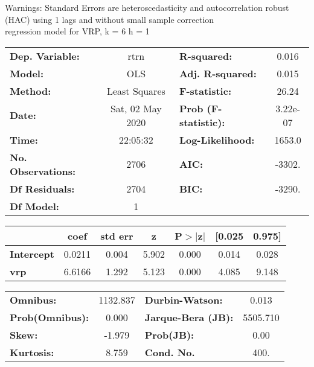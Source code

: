 Warnings: \newline
 [1] Standard Errors are heteroscedasticity and autocorrelation robust (HAC) using 1 lags and without small sample correction\\ 

regression model for VRP, k = 6 h = 1\begin{center}
\begin{tabular}{lclc}
\toprule
\textbf{Dep. Variable:}    &       rtrn       & \textbf{  R-squared:         } &     0.016   \\
\textbf{Model:}            &       OLS        & \textbf{  Adj. R-squared:    } &     0.015   \\
\textbf{Method:}           &  Least Squares   & \textbf{  F-statistic:       } &     26.24   \\
\textbf{Date:}             & Sat, 02 May 2020 & \textbf{  Prob (F-statistic):} &  3.22e-07   \\
\textbf{Time:}             &     22:05:32     & \textbf{  Log-Likelihood:    } &    1653.0   \\
\textbf{No. Observations:} &        2706      & \textbf{  AIC:               } &    -3302.   \\
\textbf{Df Residuals:}     &        2704      & \textbf{  BIC:               } &    -3290.   \\
\textbf{Df Model:}         &           1      & \textbf{                     } &             \\
\bottomrule
\end{tabular}
\begin{tabular}{lcccccc}
                   & \textbf{coef} & \textbf{std err} & \textbf{z} & \textbf{P$> |$z$|$} & \textbf{[0.025} & \textbf{0.975]}  \\
\midrule
\textbf{Intercept} &       0.0211  &        0.004     &     5.902  &         0.000        &        0.014    &        0.028     \\
\textbf{vrp}       &       6.6166  &        1.292     &     5.123  &         0.000        &        4.085    &        9.148     \\
\bottomrule
\end{tabular}
\begin{tabular}{lclc}
\textbf{Omnibus:}       & 1132.837 & \textbf{  Durbin-Watson:     } &    0.013  \\
\textbf{Prob(Omnibus):} &   0.000  & \textbf{  Jarque-Bera (JB):  } & 5505.710  \\
\textbf{Skew:}          &  -1.979  & \textbf{  Prob(JB):          } &     0.00  \\
\textbf{Kurtosis:}      &   8.759  & \textbf{  Cond. No.          } &     400.  \\
\bottomrule
\end{tabular}
\end{center}

